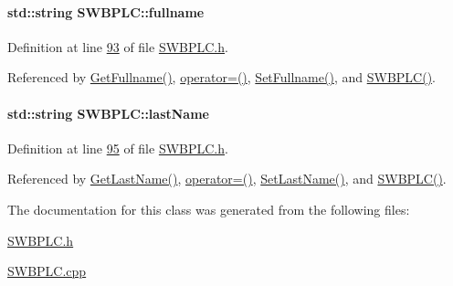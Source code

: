 \paragraph[{\texorpdfstring{fullname}{fullname}}]{\setlength{\rightskip}{0pt plus 5cm}std\+::string S\+W\+B\+P\+L\+C\+::fullname\hspace{0.3cm}{\ttfamily [private]}}\hypertarget{class_s_w_b_p_l_c_a5de90ba5cac0107fa5361458a0df839e_a5de90ba5cac0107fa5361458a0df839e}{}\label{class_s_w_b_p_l_c_a5de90ba5cac0107fa5361458a0df839e_a5de90ba5cac0107fa5361458a0df839e}


Definition at line \hyperlink{_s_w_b_p_l_c_8h_source_l00093}{93} of file \hyperlink{_s_w_b_p_l_c_8h_source}{S\+W\+B\+P\+L\+C.\+h}.



Referenced by \hyperlink{_s_w_b_p_l_c_8cpp_source_l00104}{Get\+Fullname()}, \hyperlink{_s_w_b_p_l_c_8h_source_l00063}{operator=()}, \hyperlink{_s_w_b_p_l_c_8cpp_source_l00100}{Set\+Fullname()}, and \hyperlink{_s_w_b_p_l_c_8h_source_l00024}{S\+W\+B\+P\+L\+C()}.

\paragraph[{\texorpdfstring{last\+Name}{lastName}}]{\setlength{\rightskip}{0pt plus 5cm}std\+::string S\+W\+B\+P\+L\+C\+::last\+Name\hspace{0.3cm}{\ttfamily [private]}}\hypertarget{class_s_w_b_p_l_c_aa06b2e569dd1fef8e43dfda1b34d67f3_aa06b2e569dd1fef8e43dfda1b34d67f3}{}\label{class_s_w_b_p_l_c_aa06b2e569dd1fef8e43dfda1b34d67f3_aa06b2e569dd1fef8e43dfda1b34d67f3}


Definition at line \hyperlink{_s_w_b_p_l_c_8h_source_l00095}{95} of file \hyperlink{_s_w_b_p_l_c_8h_source}{S\+W\+B\+P\+L\+C.\+h}.



Referenced by \hyperlink{_s_w_b_p_l_c_8cpp_source_l00088}{Get\+Last\+Name()}, \hyperlink{_s_w_b_p_l_c_8h_source_l00063}{operator=()}, \hyperlink{_s_w_b_p_l_c_8cpp_source_l00084}{Set\+Last\+Name()}, and \hyperlink{_s_w_b_p_l_c_8h_source_l00024}{S\+W\+B\+P\+L\+C()}.



The documentation for this class was generated from the following files\+:\begin{DoxyCompactItemize}
\item 
\hyperlink{_s_w_b_p_l_c_8h}{S\+W\+B\+P\+L\+C.\+h}\item 
\hyperlink{_s_w_b_p_l_c_8cpp}{S\+W\+B\+P\+L\+C.\+cpp}\end{DoxyCompactItemize}
